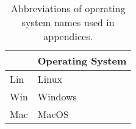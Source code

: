 \begin{table}
\centering
\caption{Abbreviations of operating system names used in appendices.}
\label{tab:keys-os}
\begin{tabular}{ll}
\toprule
{} & Operating System \\
\midrule
 Lin &            Linux \\
 Win &          Windows \\
 Mac &            MacOS \\
\bottomrule
\end{tabular}
\end{table}
\pagebreak